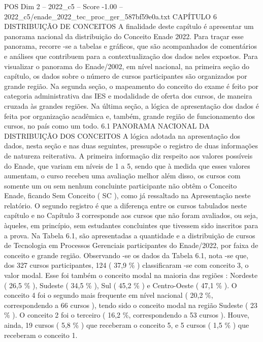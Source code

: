 \begin{textsample}{POS Dim 2 – 2022\_c5 – Score -1.00 – 2022\_c5/enade\_2022\_tec\_proc\_ger\_587bf59e0a.txt}  \label{ex:f2_pos_219}
CAPÍTULO 6 DISTRIBUIÇÃO DE CONCEITOS A finalidade deste capítulo é apresentar um panorama nacional da distribuição do Conceito Enade 2022.
Para traçar esse panorama, recorre -se a tabelas e gráficos, que são acompanhados de comentários e análises que contribuem para a contextualização dos dados neles expostos.
Para visualizar o panorama do Enade/2002, em nível nacional, na primeira seção do capítulo, os dados sobre o número de cursos participantes são organizados por grande região.
Na segunda seção, o mapeamento do conceito do exame é feito por categoria administrativa das IES e modalidade de oferta dos cursos, de maneira cruzada às grandes regiões.
Na última seção, a lógica de apresentação dos dados é feita por organização acadêmica e, também, grande região de funcionamento dos cursos, no país como um todo. 6.1 PANORAMA NACIONAL DA DISTRIBUIÇÃO DOS CONCEITOS A lógica adotada na apresentação dos dados, nesta seção e nas duas seguintes, pressupõe o registro de duas informações de natureza reiterativa.
A primeira informação diz respeito aos valores possíveis do Enade, que variam em níveis de 1 a 5, sendo que à medida que esses valores aumentam, o curso recebeu uma avaliação melhor além disso, os cursos com somente um ou sem nenhum concluinte participante não obtêm o Conceito Enade, ficando Sem Conceito ( SC ), como já ressaltado na Apresentação neste relatório.
O segundo registro é que a diferença entre os cursos tabulados neste capítulo e no Capítulo 3 corresponde aos cursos que não foram avaliados, ou seja, àqueles, em princípio, sem estudantes concluintes que tivessem sido inscritos para a prova.
Na Tabela 6.1, são apresentadas a quantidade e a distribuição de cursos de Tecnologia em Processos Gerenciais participantes do Enade/2022, por faixa de conceito e grande região.
Observando -se os dados da Tabela 6.1, nota -se que, dos 327 cursos participantes, 124 ( 37,9 \% ) classificaram -se com conceito 3, o valor modal.
Esse foi também o conceito modal na maioria das regiões : Nordeste ( 26,5 \% ), Sudeste ( 34,5 \% ), Sul ( 45,2 \% ) e Centro-Oeste ( 47,1 \% ).
O conceito 4 foi o segundo mais frequente em nível nacional ( 20,2 \%, correspondendo a 66 cursos ), tendo sido o conceito modal na região Sudeste ( 23 \% ).
O conceito 2 foi o terceiro ( 16,2 \%, correspondendo a 53 cursos ).
Houve, ainda, 19 cursos ( 5,8 \% ) que receberam o conceito 5, e 5 cursos ( 1,5 \% ) que receberam o conceito 1.

\end{textsample}
